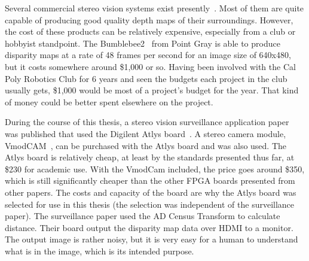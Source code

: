 Several commercial stereo vision systems exist presently~\cite{xilinxSpartan3APaper}. Most of them are quite capable of producing good quality depth maps of their surroundings. However, the cost of these products can be relatively expensive, especially from a club or hobbyist standpoint. The Bumblebee2~\cite{bumblebee} from Point Gray is able to produce disparity maps at a rate of 48 frames per second for an image size of 640x480, but it costs somewhere around \$1,000 or so. Having been involved with the Cal Poly Robotics Club for 6 years and seen the budgets each project in the club usually gets, \$1,000 would be most of a project's budget for the year. That kind of money could be better spent elsewhere on the project.

During the course of this thesis, a stereo vision surveillance application paper~\cite{surveillance} was published that used the Digilent Atlys board~\cite{atlysBoard}. A stereo camera module, VmodCAM~\cite{vmodcam}, can be purchased with the Atlys board and was also used. The Atlys board is relatively cheap, at least by the standards presented thus far, at \$230 for academic use. With the VmodCam included, the price goes around \$350, which is still significantly cheaper than the other FPGA boards presented from other papers. The costs and capacity of the board are why the Atlys board was selected for use in this thesis (the selection was independent of the surveillance paper). The surveillance paper used the AD Census Transform to calculate distance. Their board output the disparity map data over HDMI to a monitor. The output image is rather noisy, but it is very easy for a human to understand what is in the image, which is its intended purpose.